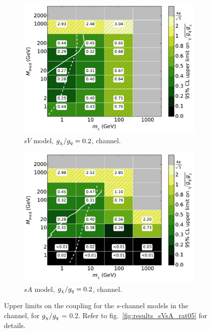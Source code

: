 \begin{figure}
  \centering
  \begin{subfigure}[t]{0.495\textwidth}
    \centering
    \includegraphics[width=1.\textwidth]{figures/grid_basepoints_SVD_rat02_monojet.pdf}
    \caption{$sV$ model, $g_{\chi}/g_q = 0.2$, \monojet channel.}
  \end{subfigure}
  \begin{subfigure}[t]{0.495\textwidth}
    \centering
    \includegraphics[width=1.\textwidth]{figures/grid_basepoints_SAD_rat02_monojet.pdf}
    \caption{$sA$ model, $g_{\chi}/g_q = 0.2$, \monojet channel.}
  \end{subfigure}
  \caption{Upper limits on the coupling for the $s$-channel models in the \monojet channel, for $g_{\chi} / g_q$ = 0.2. Refer to fig.~\ref{fig:results_sVsA_rat05} for details.}
  \label{fig:results_sVsA_rat02}
\end{figure}

